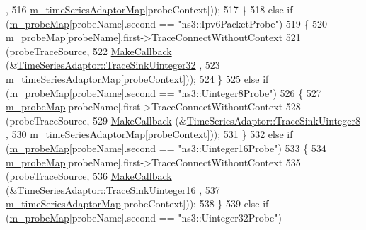 \begin{DoxyCode}
      ,
516                       \hyperlink{classns3_1_1FileHelper_a2e55bee0c776ab5f14cc2d4dfbfcc361}{m\_timeSeriesAdaptorMap}[probeContext]));
517     \}
518   \textcolor{keywordflow}{else} \textcolor{keywordflow}{if} (\hyperlink{classns3_1_1FileHelper_a69184708162929e89458eed5956791e1}{m\_probeMap}[probeName].second == \textcolor{stringliteral}{"ns3::Ipv6PacketProbe"})
519     \{
520       \hyperlink{classns3_1_1FileHelper_a69184708162929e89458eed5956791e1}{m\_probeMap}[probeName].first->TraceConnectWithoutContext
521         (probeTraceSource,
522         \hyperlink{group__makecallbackmemptr_ga9376283685aa99d204048d6a4b7610a4}{MakeCallback} (&\hyperlink{classns3_1_1TimeSeriesAdaptor_add04eee090a86dc859b2415710c85b30}{TimeSeriesAdaptor::TraceSinkUinteger32}
      ,
523                       \hyperlink{classns3_1_1FileHelper_a2e55bee0c776ab5f14cc2d4dfbfcc361}{m\_timeSeriesAdaptorMap}[probeContext]));
524     \}
525   \textcolor{keywordflow}{else} \textcolor{keywordflow}{if} (\hyperlink{classns3_1_1FileHelper_a69184708162929e89458eed5956791e1}{m\_probeMap}[probeName].second == \textcolor{stringliteral}{"ns3::Uinteger8Probe"})
526     \{
527       \hyperlink{classns3_1_1FileHelper_a69184708162929e89458eed5956791e1}{m\_probeMap}[probeName].first->TraceConnectWithoutContext
528         (probeTraceSource,
529         \hyperlink{group__makecallbackmemptr_ga9376283685aa99d204048d6a4b7610a4}{MakeCallback} (&\hyperlink{classns3_1_1TimeSeriesAdaptor_a5f8fb38787207ef1b0cedc841bec7ff8}{TimeSeriesAdaptor::TraceSinkUinteger8}
      ,
530                       \hyperlink{classns3_1_1FileHelper_a2e55bee0c776ab5f14cc2d4dfbfcc361}{m\_timeSeriesAdaptorMap}[probeContext]));
531     \}
532   \textcolor{keywordflow}{else} \textcolor{keywordflow}{if} (\hyperlink{classns3_1_1FileHelper_a69184708162929e89458eed5956791e1}{m\_probeMap}[probeName].second == \textcolor{stringliteral}{"ns3::Uinteger16Probe"})
533     \{
534       \hyperlink{classns3_1_1FileHelper_a69184708162929e89458eed5956791e1}{m\_probeMap}[probeName].first->TraceConnectWithoutContext
535         (probeTraceSource,
536         \hyperlink{group__makecallbackmemptr_ga9376283685aa99d204048d6a4b7610a4}{MakeCallback} (&\hyperlink{classns3_1_1TimeSeriesAdaptor_ae292de4e1a29362d3ee5e26150244cb6}{TimeSeriesAdaptor::TraceSinkUinteger16}
      ,
537                       \hyperlink{classns3_1_1FileHelper_a2e55bee0c776ab5f14cc2d4dfbfcc361}{m\_timeSeriesAdaptorMap}[probeContext]));
538     \}
539   \textcolor{keywordflow}{else} \textcolor{keywordflow}{if} (\hyperlink{classns3_1_1FileHelper_a69184708162929e89458eed5956791e1}{m\_probeMap}[probeName].second == \textcolor{stringliteral}{"ns3::Uinteger32Probe"})

\end{DoxyCode}
